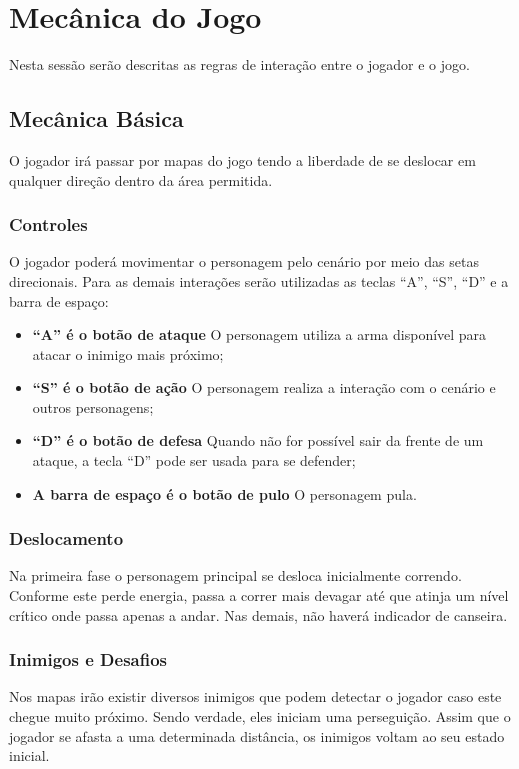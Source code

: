 \section{Mecânica do Jogo}

Nesta sessão serão descritas as regras de interação entre o jogador e o jogo.

\subsection {Mecânica Básica}

O jogador irá passar por mapas do jogo tendo a liberdade de se deslocar em
 qualquer direção dentro da área permitida.

\subsubsection {Controles}

O jogador poderá movimentar o personagem pelo cenário por meio das setas
 direcionais. Para as demais interações serão utilizadas as teclas
 ``A'', ``S'', ``D'' e a barra de espaço:
\begin{itemize}
\item {\bf ``A'' é o botão de ataque} O personagem utiliza a arma disponível
para atacar o inimigo mais próximo;
\item {\bf ``S'' é o botão de ação} O personagem realiza a interação com o
 cenário e outros personagens;
\item {\bf ``D'' é o botão de defesa} Quando não for possível sair da frente
 de um ataque, a tecla ``D'' pode ser usada para se defender;
\item {\bf A barra de espaço é o botão de pulo} O personagem pula.
\end{itemize}

\subsubsection {Deslocamento}
Na primeira fase o personagem principal se desloca inicialmente correndo. 
Conforme este perde energia, passa a correr mais devagar até que atinja um 
nível crítico onde passa apenas a andar. Nas demais, não haverá indicador 
de canseira.

\subsubsection {Inimigos e Desafios}
Nos mapas irão existir diversos inimigos que podem detectar o jogador caso 
este chegue muito próximo. Sendo verdade, eles iniciam uma perseguição. Assim 
que o jogador se afasta a uma determinada distância, os inimigos voltam ao 
seu estado inicial. 

